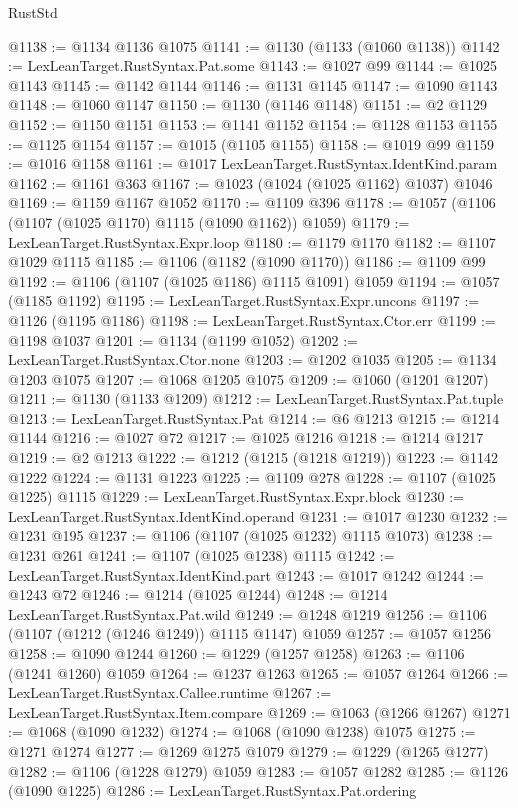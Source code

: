 \begin{lexlean}{RustStd}
\begin{coremodule}
@1138 := @1134 @1136 @1075
@1141 := @1130 (@1133 (@1060 @1138))
@1142 := LexLeanTarget.RustSyntax.Pat.some
@1143 := @1027 @99
@1144 := @1025 @1143
@1145 := @1142 @1144
@1146 := @1131 @1145
@1147 := @1090 @1143
@1148 := @1060 @1147
@1150 := @1130 (@1146 @1148)
@1151 := @2 @1129
@1152 := @1150 @1151
@1153 := @1141 @1152
@1154 := @1128 @1153
@1155 := @1125 @1154
@1157 := @1015 (@1105 @1155)
@1158 := @1019 @99
@1159 := @1016 @1158
@1161 := @1017 LexLeanTarget.RustSyntax.IdentKind.param
@1162 := @1161 @363
@1167 := @1023 (@1024 (@1025 @1162) @1037) @1046
@1169 := @1159 @1167 @1052
@1170 := @1109 @396
@1178 := @1057 (@1106 (@1107 (@1025 @1170) @1115 (@1090 @1162)) @1059)
@1179 := LexLeanTarget.RustSyntax.Expr.loop
@1180 := @1179 @1170
@1182 := @1107 @1029 @1115
@1185 := @1106 (@1182 (@1090 @1170))
@1186 := @1109 @99
@1192 := @1106 (@1107 (@1025 @1186) @1115 @1091) @1059
@1194 := @1057 (@1185 @1192)
@1195 := LexLeanTarget.RustSyntax.Expr.uncons
@1197 := @1126 (@1195 @1186)
@1198 := LexLeanTarget.RustSyntax.Ctor.err
@1199 := @1198 @1037
@1201 := @1134 (@1199 @1052)
@1202 := LexLeanTarget.RustSyntax.Ctor.none
@1203 := @1202 @1035
@1205 := @1134 @1203 @1075
@1207 := @1068 @1205 @1075
@1209 := @1060 (@1201 @1207)
@1211 := @1130 (@1133 @1209)
@1212 := LexLeanTarget.RustSyntax.Pat.tuple
@1213 := LexLeanTarget.RustSyntax.Pat
@1214 := @6 @1213
@1215 := @1214 @1144
@1216 := @1027 @72
@1217 := @1025 @1216
@1218 := @1214 @1217
@1219 := @2 @1213
@1222 := @1212 (@1215 (@1218 @1219))
@1223 := @1142 @1222
@1224 := @1131 @1223
@1225 := @1109 @278
@1228 := @1107 (@1025 @1225) @1115
@1229 := LexLeanTarget.RustSyntax.Expr.block
@1230 := LexLeanTarget.RustSyntax.IdentKind.operand
@1231 := @1017 @1230
@1232 := @1231 @195
@1237 := @1106 (@1107 (@1025 @1232) @1115 @1073)
@1238 := @1231 @261
@1241 := @1107 (@1025 @1238) @1115
@1242 := LexLeanTarget.RustSyntax.IdentKind.part
@1243 := @1017 @1242
@1244 := @1243 @72
@1246 := @1214 (@1025 @1244)
@1248 := @1214 LexLeanTarget.RustSyntax.Pat.wild
@1249 := @1248 @1219
@1256 := @1106 (@1107 (@1212 (@1246 @1249)) @1115 @1147) @1059
@1257 := @1057 @1256
@1258 := @1090 @1244
@1260 := @1229 (@1257 @1258)
@1263 := @1106 (@1241 @1260) @1059
@1264 := @1237 @1263
@1265 := @1057 @1264
@1266 := LexLeanTarget.RustSyntax.Callee.runtime
@1267 := LexLeanTarget.RustSyntax.Item.compare
@1269 := @1063 (@1266 @1267)
@1271 := @1068 (@1090 @1232)
@1274 := @1068 (@1090 @1238) @1075
@1275 := @1271 @1274
@1277 := @1269 @1275 @1079
@1279 := @1229 (@1265 @1277)
@1282 := @1106 (@1228 @1279) @1059
@1283 := @1057 @1282
@1285 := @1126 (@1090 @1225)
@1286 := LexLeanTarget.RustSyntax.Pat.ordering

\end{coremodule}
\end{lexlean}
